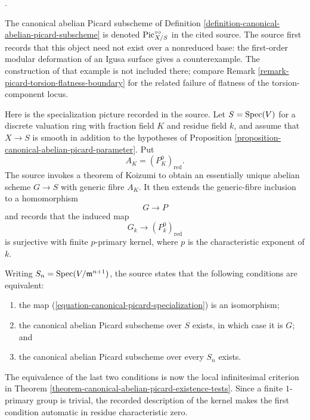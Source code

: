 \begin{remark}
\label{remark-canonical-abelian-picard-specialization}
\begin{reference}
\cite[Expos\'e 236, Remarks 3.4, pp. 238--239]{FGA}.
\end{reference}
The canonical abelian Picard subscheme of Definition
\ref{definition-canonical-abelian-picard-subscheme} is denoted
$\mathrm{Pic}_{X/S}^{\circ\circ}$ in the cited source. The source first
records that this object need not exist over a nonreduced base: the
first-order modular deformation of an Igusa surface gives a counterexample.
The construction of that example is not included there; compare Remark
\ref{remark-picard-torsion-flatness-boundary} for the related failure of
flatness of the torsion-component locus.

Here is the specialization picture recorded in the source. Let
$S = \mathop{\mathrm{Spec}}(V)$ for a discrete valuation ring with fraction field $K$ and
residue field $k$, and assume that $X \to S$ is smooth in addition to the
hypotheses of Proposition
\ref{proposition-canonical-abelian-picard-parameter}. Put
$$
A_K = (P_K^0)_{\mathrm{red}}.
$$
The source invokes a theorem of Koizumi to obtain an essentially unique
abelian scheme $G \to S$ with generic fibre $A_K$. It then extends the
generic-fibre inclusion to a homomorphism
$$
G \longrightarrow P
$$
and records that the induced map
\begin{equation}
\label{equation-canonical-picard-specialization}
G_k \longrightarrow (P_k^0)_{\mathrm{red}}
\end{equation}
is surjective with finite $p$-primary kernel, where $p$ is the
characteristic exponent of $k$.

Writing $S_n = \mathop{\mathrm{Spec}}(V/\mathfrak m^{n + 1})$, the source states that the
following conditions are equivalent:
\begin{enumerate}
\item the map (\ref{equation-canonical-picard-specialization}) is an
isomorphism;
\item the canonical abelian Picard subscheme over $S$ exists, in which case
it is $G$; and
\item the canonical abelian Picard subscheme over every $S_n$ exists.
\end{enumerate}
The equivalence of the last two conditions is now the local infinitesimal
criterion in Theorem
\ref{theorem-canonical-abelian-picard-existence-tests}. Since a finite
$1$-primary group is trivial, the recorded description of the kernel makes
the first condition automatic in residue characteristic zero.


\end{remark}
